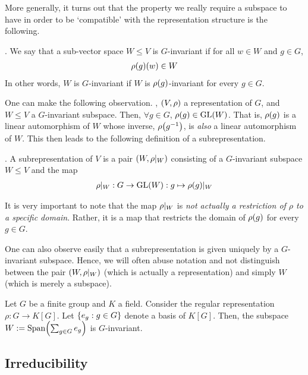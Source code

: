 More generally, it turns out that the property we really require a subspace to have in order to be `compatible' with the representation structure is the following.

\begin{boxdefinition}[$G$-Invariance]
    . We say that a sub-vector space $W \leq V$ is $G$-invariant if for all $w \in W$ and $g \in G$,
    \begin{align*}
        \rho\!\left( g \right)\!(w) \in W
    \end{align*}
    In other words, $W$ is $G$-invariant if $W$ is $\rho\!\left( g \right)$-invariant for every $g \in G$.
\end{boxdefinition}

One can make the following observation. , $\left( V,\rho \right)$ a representation of $G$, and $W \leq V$ a $G$-invariant subspace. Then, $\forall g \in G$, $\rho\!\left( g \right) \in \operatorname{GL}\!\left( W \right)$. That is, $\rho\!\left( g \right)$ is a linear automorphism of $W$ whose inverse, $\rho\!\left( g^{-1} \right)$, is \textit{also} a linear automorphism of $W$. This then leads to the following definition of a subrepresentation.

\begin{boxdefinition}[Subrepresentation]
    . A subrepresentation of $V$ is a pair $\left( W, \rho\vert_{W} \right)$ consisting of a $G$-invariant subspace $W \leq V$ and the map
    \begin{align*}
        \rho\vert_{W} : G \to \operatorname{GL}\!\left( W \right) : g \mapsto \rho\!\left( g \right)\!\vert_W
    \end{align*}
\end{boxdefinition}
It is very important to note that the map $\rho\vert_{W}$ is \textit{not actually a restriction of $\rho$ to a specific domain}. Rather, it is a map that restricts the domain of $\rho\!\left( g \right)$ for every $g \in G$.

One can also observe easily that a subrepresentation is given uniquely by a $G$-invariant subspace. Hence, we will often abuse notation and not distinguish between the pair $\left( W, \rho\vert_{W} \right)$ (which is actually a representation) and simply $W$ (which is merely a subspace).

\begin{boxexample} \label{Ch1:Eg:Regular_is_Subrep}
    Let $G$ be a finite group and $K$ a field. Consider the regular representation $\rho : G \to K[G]$. Let $\left\{ e_g : g \in G \right\}$ denote a basis of $K[G]$. Then, the subspace $W := \operatorname{Span}\!\left( \sum_{g \in G} e_g \right)$ is $G$-invariant.
\end{boxexample}

\subsection{Irreducibility}

